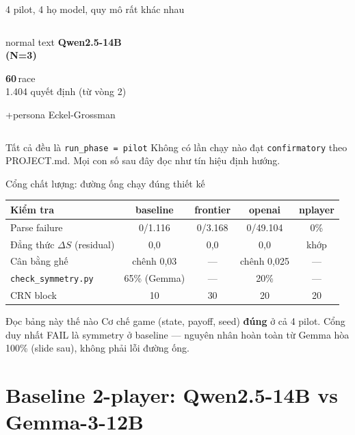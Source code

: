 \documentclass[9pt,aspectratio=169]{beamer}
\newcommand{\bad}[1]{\textcolor{RaceRed}{\textbf{#1}}}
\newcommand{\good}[1]{\textcolor{RaceGreenDk}{\textbf{#1}}}
\newcommand{\cmark}{\ding{51}}
\newcommand{\xmark}{\ding{55}}
\begin{document}
\begin{frame}{4 pilot, 4 họ model, quy mô rất khác nhau}
\begin{columns}[T,onlytextwidth]
\begin{beamercolorbox}[sep=.3cm,rounded=true]{normal text}
{\bfseries Qwen2.5-14B\\(N=3)}\par\vspace{6pt}
{\Large\bfseries\color{RaceCyanDark} 60}\,race\\
{\small\color{RaceMuted}1.404 quyết định (từ vòng 2)}\par\vspace{4pt}
{\tiny +persona Eckel-Grossman}
\end{beamercolorbox}
\end{columns}
\vfill
\begin{alertblock}{Tất cả đều là \texttt{run\_phase = pilot}}
\small Không có lần chạy nào đạt \texttt{confirmatory} theo PROJECT.md. Mọi con số sau đây đọc như tín hiệu định hướng.
\end{alertblock}
\end{frame}

\begin{frame}{Cổng chất lượng: đường ống chạy đúng thiết kế}
\centering
\small
\renewcommand{\arraystretch}{1.35}
\begin{tabular}{lcccc}
\toprule
Kiểm tra & baseline & frontier & openai & nplayer \\
\midrule
Parse failure & \good{\cmark} 0/1.116 & \good{\cmark} 0/3.168 & \good{\cmark} 0/49.104 & \good{\cmark} 0\% \\
Đẳng thức $\Delta S$ (residual) & \good{\cmark} 0,0 & \good{\cmark} 0,0 & \good{\cmark} 0,0 & \good{\cmark} khớp \\
Cân bằng ghế & \good{\cmark} chênh 0,03 & --- & \good{\cmark} chênh 0,025 & --- \\
\texttt{check\_symmetry.py} & \bad{\xmark} 65\% (Gemma) & --- & \good{\cmark} 20\% & --- \\
CRN block & \good{\cmark} 10 & \good{\cmark} 30 & \good{\cmark} 20 & \good{\cmark} 20 \\
\bottomrule
\end{tabular}
\vspace{0.5em}
\begin{exampleblock}{Đọc bảng này thế nào}
\small Cơ chế game (state, payoff, seed) \good{đúng} ở cả 4 pilot. Cổng duy nhất FAIL là symmetry ở baseline --- nguyên nhân hoàn toàn từ Gemma hòa 100\% (slide sau), không phải lỗi đường ống.
\end{exampleblock}
\end{frame}

\section{Baseline 2-player: Qwen2.5-14B vs Gemma-3-12B}
\end{document}
